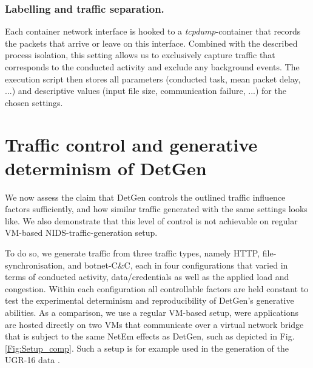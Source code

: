 \documentclass[runningheads]{llncs}
\begin{document}

\subsubsection*{Labelling and traffic separation.}

Each container network interface is hooked to a \emph{tcpdump}-container that records the packets that arrive or leave on this interface. Combined with the described process isolation, this setting allows us to exclusively capture traffic that corresponds to the conducted activity and exclude any background events. The execution script then stores all parameters (conducted task, mean packet delay, ...) and descriptive values (input file size, communication failure, ...) for the chosen settings.





\section{Traffic control and generative determinism of DetGen}\label{Sec:Determinism}
We now assess the claim that DetGen controls the outlined traffic influence factors sufficiently, and how similar traffic generated with the same settings looks like. We also demonstrate that this level of control is not achievable on regular VM-based NIDS-traffic-generation setup.

To do so, we generate traffic from three traffic types, namely HTTP, file-synchronisation, and botnet-C\&C, each in four configurations that varied in terms of conducted activity, data/credentials as well as the applied load and congestion. Within each configuration all controllable factors are held constant to test the experimental determinism and reproducibility of DetGen's generative abilities. 
As a comparison, we use a regular VM-based setup, were applications are hosted directly on two VMs that communicate over a virtual network bridge that is subject to the same NetEm effects as DetGen, such as depicted in Fig. \ref{Fig:Setup_comp}. Such a setup is for example used in the generation of the UGR-16 data \cite{macia2018ugr}.
\end{document}
